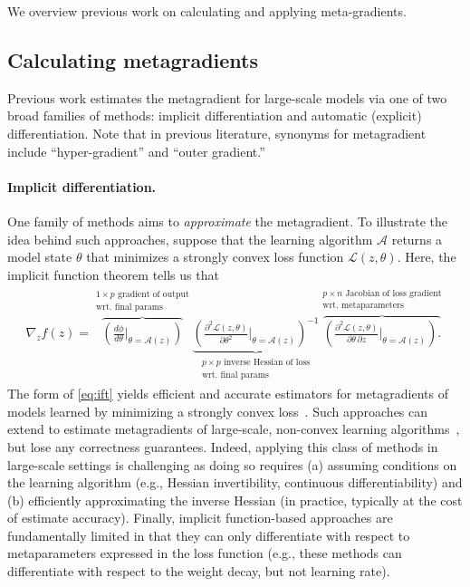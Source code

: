 We overview previous work on calculating and applying meta-gradients.

\subsection{Calculating metagradients}
Previous work estimates the metagradient for large-scale models via one of
two broad families of methods: implicit differentiation and automatic (explicit)
differentiation. Note that in previous literature, synonyms for metagradient
include ``hyper-gradient'' and ``outer gradient.''

\paragraph{Implicit differentiation.}
One family of methods aims to {\em approximate} the metagradient.
To illustrate the idea behind such approaches, suppose that the
learning algorithm
$\mathcal{A}$ returns a model state $\theta$ that minimizes a strongly
convex loss function $\mathcal{L}(z, \theta)$. Here, the implicit function
theorem tells us that
\begin{align}
  \label{eq:ift}
  \nabla_z f(z) = \overbrace{
    \left(\frac{d\phi}{d\theta}\bigg|_{\theta = \mathcal{A}(z)}\right)
  }^{\substack{1 \times p \text{ gradient of output} \\ \text{wrt.
  final params}}}
  \underbrace{
    \left(
      \frac{\partial^2 \mathcal{L}(z, \theta)}{\partial
      \theta^2}\bigg|_{\theta = \mathcal{A}(z)}
    \right)^{-1}
  }_{\substack{p \times p \text{ inverse Hessian of loss}
  \\ \text{wrt. final params}}}
  \overbrace{
    \left(\frac{\partial^2 \mathcal{L}(z, \theta)}{\partial
    \theta\,\partial z}\bigg|_{\theta = \mathcal{A}(z)}\right).
  }^{
    \substack{p \times n \text{ Jacobian of loss gradient}
    \\ \text{wrt. metaparameters}}
  }
\end{align}
The form of \eqref{eq:ift} yields efficient and accurate estimators for
metagradients of models learned by minimizing a strongly convex
loss~\citep{bertrand2020implicit,bertrand2022implicit,kolter2020deep,blondel2022efficient,scieur2022curse}.
Such approaches can extend to estimate metagradients of large-scale, non-convex
learning
algorithms~\citep{bengio2000gradient,koh2017understanding,rajeswaran2019meta,finn2017model,lorraine2020optimizing,chen2020stabilizing,bae2022if},
but lose any correctness guarantees. Indeed, applying this class of methods in
large-scale settings is challenging as doing so requires (a) assuming conditions
on the learning algorithm (e.g., Hessian invertibility, continuous
differentiability) and (b) efficiently approximating the inverse Hessian (in
practice, typically at the cost of estimate accuracy). Finally, implicit
function-based approaches are fundamentally limited in that they can only
differentiate with respect to metaparameters expressed in the loss function
(e.g., these methods can differentiate with respect to the weight decay, but not
learning rate).

